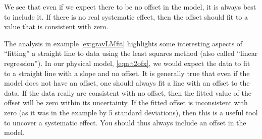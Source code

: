 \begin{example}{}
We see that even if we expect there to be no offset in the model, it is always best to include it. If there is no real systematic effect, then the offset should fit to a value that is consistent with zero. 

\end{example}

The analysis in example \ref{ex:gravLMfit} highlights some interesting aspects of ``fitting'' a straight line to data using the least squares method (also called ``linear regression''). In our physical model, \ref{eqn:t2ofx}, we would expect the data to fit to a straight line with a slope and no offset. It is generally true that even if the model does not have an offset, one should always fit a line with an offset to the data. If the data really are consistent with no offset, then the fitted value of the offset will be zero within its uncertainty. If the fitted offset is inconsistent with zero (as it was in the example by 5 standard deviations), then this is a useful tool to uncover a systematic effect. You should thus always include an offset in the model. 

